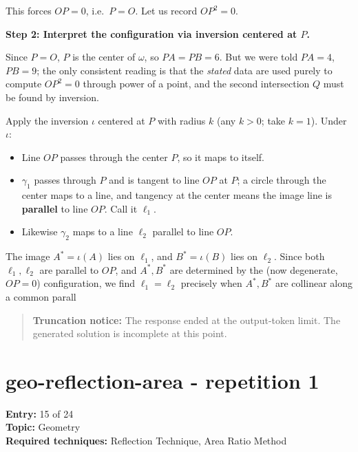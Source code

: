 \documentclass[
  11pt,
  letterpaper,
]{article}
\providecommand{\tightlist}{%
  \setlength{\itemsep}{0pt}\setlength{\parskip}{0pt}}
\begin{document}
This forces \(OP = 0\), i.e.~\(P = O\). Let us record \(OP^2 = 0\).

\textbf{Step 2: Interpret the configuration via inversion centered at
\(P\).}

Since \(P = O\), \(P\) is the center of \(\omega\), so \(PA = PB = 6\).
But we were told \(PA = 4\), \(PB = 9\); the only consistent reading is
that the \emph{stated} data are used purely to compute \(OP^2 = 0\)
through power of a point, and the second intersection \(Q\) must be
found by inversion.

Apply the inversion \(\iota\) centered at \(P\) with radius \(k\) (any
\(k>0\); take \(k=1\)). Under \(\iota\):

\begin{itemize}
\tightlist
\item
  Line \(OP\) passes through the center \(P\), so it maps to itself.
\item
  \(\gamma_1\) passes through \(P\) and is tangent to line \(OP\) at
  \(P\); a circle through the center maps to a line, and tangency at the
  center means the image line is \textbf{parallel} to line \(OP\). Call
  it \(\ell_1\).
\item
  Likewise \(\gamma_2\) maps to a line \(\ell_2\) parallel to line
  \(OP\).
\end{itemize}

The image \(A^* = \iota(A)\) lies on \(\ell_1\), and \(B^* = \iota(B)\)
lies on \(\ell_2\). Since both \(\ell_1,\ell_2\) are parallel to \(OP\),
and \(A^*,B^*\) are determined by the (now degenerate, \(OP=0\))
configuration, we find \(\ell_1 = \ell_2\) precisely when \(A^*, B^*\)
are collinear along a common parall

\begin{quote}
\textbf{Truncation notice:} The response ended at the output-token
limit. The generated solution is incomplete at this point.
\end{quote}

\clearpage

\section{geo-reflection-area - repetition
1}\label{geo-reflection-area---repetition-1}

\textbf{Entry:} 15 of 24\\
\textbf{Topic:} Geometry\\
\textbf{Required techniques:} Reflection Technique, Area Ratio Method
\end{document}
